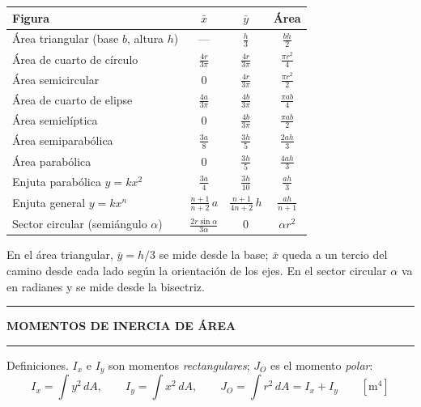 \documentclass[10pt,a4paper]{article}
\newcommand{\seccion}[1]{%
  \vspace{2mm}\hrule\vspace{1mm}%
  \textbf{\footnotesize\MakeUppercase{#1}}\vspace{1mm}\hrule\vspace{2mm}}
\newcommand{\bx}{\bar{x}}
\newcommand{\by}{\bar{y}}
\begin{document}
\vspace{2mm}
\begin{center}\renewcommand{\arraystretch}{1.45}\normalsize
\begin{tabular}{@{}lccc@{}}
\toprule
\textbf{Figura} & $\bx$ & $\by$ & \textbf{Área} \\
\midrule
Área triangular (base $b$, altura $h$)      & ---                 & $\frac{h}{3}$        & $\frac{bh}{2}$ \\
Área de cuarto de círculo                   & $\frac{4r}{3\pi}$  & $\frac{4r}{3\pi}$    & $\frac{\pi r^{2}}{4}$ \\
Área semicircular                           & $0$                 & $\frac{4r}{3\pi}$    & $\frac{\pi r^{2}}{2}$ \\
Área de cuarto de elipse                    & $\frac{4a}{3\pi}$  & $\frac{4b}{3\pi}$    & $\frac{\pi ab}{4}$ \\
Área semielíptica                           & $0$                 & $\frac{4b}{3\pi}$    & $\frac{\pi ab}{2}$ \\
Área semiparabólica                         & $\frac{3a}{8}$     & $\frac{3h}{5}$       & $\frac{2ah}{3}$ \\
Área parabólica                             & $0$                 & $\frac{3h}{5}$       & $\frac{4ah}{3}$ \\
Enjuta parabólica \quad $y = kx^{2}$        & $\frac{3a}{4}$     & $\frac{3h}{10}$      & $\frac{ah}{3}$ \\
Enjuta general \quad $y = kx^{n}$           & $\frac{n+1}{n+2}\,a$ & $\frac{n+1}{4n+2}\,h$ & $\frac{ah}{n+1}$ \\
Sector circular (semiángulo $\alpha$)       & $\frac{2r\sin\alpha}{3\alpha}$ & $0$      & $\alpha r^{2}$ \\
\bottomrule
\end{tabular}
\end{center}

\vspace{1mm}
En el área triangular, $\by = h/3$ se mide desde la base; $\bx$ queda a un tercio
del camino desde cada lado según la orientación de los ejes. En el sector circular
$\alpha$ va en radianes y se mide desde la bisectriz.

\seccion{Momentos de inercia de área}

Definiciones. $I_x$ e $I_y$ son momentos \emph{rectangulares}; $J_O$ es el
momento \emph{polar}:
\begin{equation*}
  I_x = \int y^{2}\,dA,
  \qquad
  I_y = \int x^{2}\,dA,
  \qquad
  J_O = \int r^{2}\,dA = I_x + I_y
  \qquad [\mathrm{m^{4}}]
\end{equation*}
\end{document}
